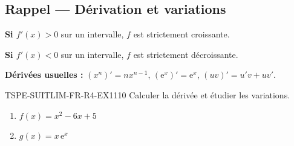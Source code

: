 

\subsection*{Rappel — Dérivation et variations}

\textbf{Si $f'(x) > 0$} sur un intervalle, $f$ est strictement croissante.

\textbf{Si $f'(x) < 0$} sur un intervalle, $f$ est strictement décroissante.

\textbf{Dérivées usuelles :} $(x^n)' = nx^{n-1}$, $(\mathrm{e}^x)' = \mathrm{e}^x$, $(uv)' = u'v + uv'$.

\begin{exercice}{TSPE-SUITLIM-FR-R4-EX1}{1}{10}
Calculer la dérivée et étudier les variations.
\begin{enumerate}
  \item $f(x) = x^2 - 6x + 5$
  \item $g(x) = x\,\mathrm{e}^x$
\end{enumerate}
\end{exercice}

